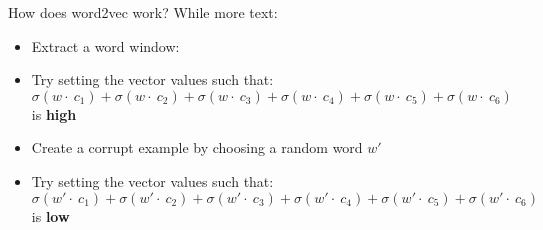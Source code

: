 \documentclass[compress]{beamer}
\begin{document}
\begin{frame}{How does word2vec work?}
    While more text:
    \begin{itemize}
        \item Extract a word window:
    \end{itemize}

        \pause
    \begin{itemize}
        \item Try setting the vector values such that:
            \[\sigma(w\cdot~c_1) + \sigma(w\cdot~c_2) + \sigma(w\cdot~c_3) +
            \sigma(w\cdot~c_4) + \sigma(w\cdot~c_5) + \sigma(w\cdot~c_6)\]
            is \textbf{high}
    \end{itemize}
        \pause
    \begin{itemize}
        \item Create a corrupt example by choosing a random word $w'$
    \end{itemize}

    \begin{itemize}
        \item Try setting the vector values such that:
            \[\sigma(w'\cdot~c_1) + \sigma(w'\cdot~c_2) + \sigma(w'\cdot~c_3) +
            \sigma(w'\cdot~c_4) + \sigma(w'\cdot~c_5) + \sigma(w'\cdot~c_6)\]
            is \textbf{low}
    \end{itemize}
\end{frame}
\end{document}
